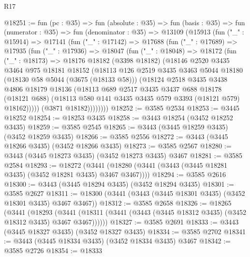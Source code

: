 \begin{lexlean}{R17}
\begin{coremodule}
@18251 := fun (pc : @35) =>
  fun (absolute : @35) =>
  fun (basis : @35) =>
  fun (numerator : @35) =>
  fun (denominator : @35) =>
  @13109
    (@15913
      (fun ("_" : @15914) =>
      @17141
        (fun ("_" : @17142) =>
        @17688
          (fun ("_" : @17689) =>
          @17935
            (fun ("_" : @17936) =>
            @18047
              (fun ("_" : @18048) =>
              @18172
                (fun ("_" : @18173) =>
                @18176
                  @18182
                  (@3398 @18182)
                  (@18146
                    @2520
                    @3435
                    @3464
                    @975
                    @18181
                    @18152
                    (@18113
                      @126
                      @2519
                      @3435
                      @3463
                      @5044
                      @18180
                      (@18130 @58 @5044 (@3675 (@18133 @58)))
                      (@18124
                        @2518
                        @3435
                        @3438
                        @4806
                        @18179
                        @18136
                        (@18113
                          @689
                          @2517
                          @3435
                          @3437
                          @688
                          @18178
                          (@18121 @688)
                          (@18113 @580 @141 @3435 @3435 @579 @3393 (@18121 @579) @18162)))))
                  (@3871 @18182))))))))
@18252 := @3585 @2534
@18253 := @3445 @18252
@18254 := @18253 @3435
@18258 := @3443 @18254 (@3452 @18252 @3435)
@18259 := @3585 @2545
@18265 := @3443 (@3445 @18259 @3435) (@3452 @18259 @3435)
@18266 := @3585 @2556
@18272 := @3443 (@3445 @18266 @3435) (@3452 @18266 @3435)
@18273 := @3585 @2567
@18280 := @3443 (@3445 @18273 @3435) (@3452 @18273 @3435) @3467
@18281 := @3585 @2584
@18293 := @18272
    (@3441 (@18280 (@3441 (@3443 (@3445 @18281 @3435) (@3452 @18281 @3435) @3467 @3467))))
@18294 := @3585 @2616
@18300 := @3443 (@3445 @18294 @3435) (@3452 @18294 @3435)
@18301 := @3585 @2627
@18311 := @18300 (@3441 (@3443 (@3445 @18301 @3435) (@3452 @18301 @3435) @3467 @3467))
@18312 := @3585 @2658
@18326 := @18265
    (@3441
      (@18293
        (@3441 (@18311 (@3441 (@3443 (@3445 @18312 @3435) (@3452 @18312 @3435) @3467 @3467))))))
@18327 := @3585 @2691
@18333 := @3443 (@3445 @18327 @3435) (@3452 @18327 @3435)
@18334 := @3585 @2702
@18341 := @3443 (@3445 @18334 @3435) (@3452 @18334 @3435) @3467
@18342 := @3585 @2726
@18354 := @18333

\end{coremodule}
\end{lexlean}
